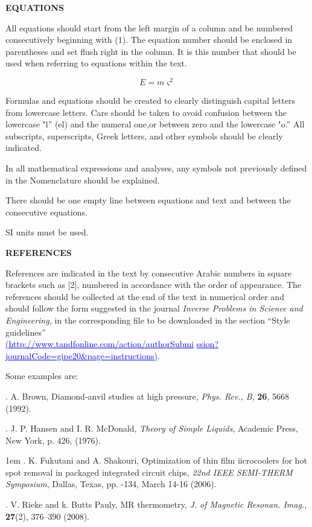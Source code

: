 \documentclass[conference,compsoc]{IEEEtran}
\begin{document}
\textbf{EQUATIONS}

All equations should start from the left margin of a column and be numbered consecutively beginning with (1). The equation number should be enclosed in parentheses and set flush right in the column. It is this number that should be used when referring to equations within the text.

\begin{equation}
\label{eq1}
E=m\varsigma^{2}
\end{equation}

Formulas and equations should be created to clearly distinguish capital letters from lowercase letters. Care should be taken to avoid confusion between the lowercase "l'' (el) and the numeral one,or between zero and the lowercase "o.'' All subscripts, superscripts, Greek letters, and other symbols should be clearly indicated.

In all mathematical expressions and analyses, any symbols not previously defined in the Nomenclature should be explained.

There should be one empty line between equations and text and between the consecutive equations.

SI units must be used.


\textbf{REFERENCES}

References are indicated in the text by consecutive Arabic numbers in square
brackets such as [2], numbered in accordance with the order of appearance.
The references should be collected at the end of the text in numerical order
and should follow the form suggested in the journal \textit{Inverse Problems in Science and Engineering,} in the corresponding
file to be downloaded in the section ``Style guidelines''\\
\textcolor{blue}{\underline{(http://www.tandfonline.com/action/authorSubmi}}
\textcolor{blue}{\underline{ssion?journalCode=gipe20\&page=instructions)}}.

Some examples are:

. A. Brown, Diamond-anvil studies at high pressure, \textit{Phys. Rev., B}, \textbf{26}, 5668
(1992).

. J. P. Hansen and I. R. McDonald, \textit{Theory of Simple Liquids}, Academic Press, New York, p. 426,
(1976).

\hangindent 1em
. K. Fukutani and A. Shakouri, Optimization of thin film iicrocoolers for
hot spot removal in packaged integrated circuit chips, \textit{22nd IEEE SEMI-THERM Symposium}, Dallas, Texas, pp.
-134, March 14-16 (2006).

. V. Rieke and k. Butts Pauly, MR thermometry, \textit{J. of Magnetic Resonan. Imag.}, \textbf{27}(2), 376--390
(2008).

\cite{artigo_abreu_1}




\end{document}
